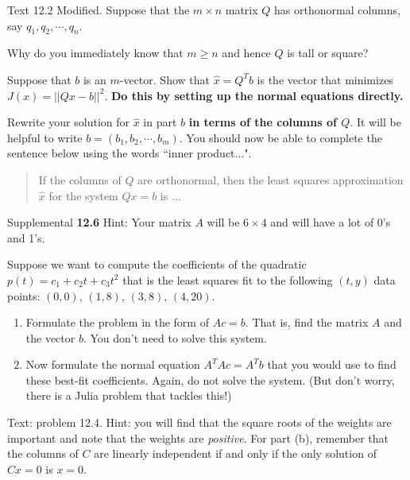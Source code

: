 \documentclass[minion]{homework}
\begin{document}
\begin{problems}

    \problem Text 12.2 Modified.  Suppose that the $m\times n$ matrix $Q$
    has orthonormal columns, say $q_1,q_2, \cdots, q_n.$
    \begin{subproblems}
        \item Why do you immediately know that $m\ge n$ and hence $Q$ is tall or square?
        \item Suppose that $b$ is an $m$-vector. Show that $\hat x = Q^T b$ is the vector that minimizes $J(x)=||Qx-b||^2$. \textbf{Do this by setting up the normal equations directly.}
        \item Rewrite your solution for $\hat x$ in part $b$ \textbf{in terms of the columns of $Q$}. It will be helpful to write $b=(b_1,b_2,\cdots,b_m).$ You should now be able to complete the sentence below using the words ``inner product...".\\
        \begin{quote} If the columns of $Q$ are orthonormal, then the least squares approximation $\hat x$ for the system $Qx=b$ is ... \end{quote}
    \end{subproblems}

    \problem Supplemental \textbf{12.6}  Hint: Your matrix $A$ will be $6 \times 4$ and will have a lot of 0's and 1's. 

    \problem Suppose we want to compute the coefficients of 
    the quadratic $p(t) = c_1 + c_2 t + c_3 t^2$ that is
    the least squares fit to the following $(t,y)$ data points:
    $(0,0)$, $(1, 8)$, $(3,8)$, $(4,20)$.

    \begin{enumerate}
        \item Formulate the problem in the form of $Ac = b$.
        That is, find the matrix $A$ and the vector $b$.  You don't need
        to solve this system.
        \item Now formulate the normal equation $A^T A c = A^T b$
        that you would use to find these best-fit coefficients. Again,
        do not solve the system. (But don't worry, there is a Julia problem that tackles this!)
    \end{enumerate}
     
    \problem Text: problem 12.4.  Hint: you will find that the square roots of the weights
    are important and note that the weights are \emph{positive}. For part (b), remember that the columns of $C$ are linearly independent
    if and only if the only solution of $Cx=0$ is $x=0$.  

\end{problems}
\end{document}
